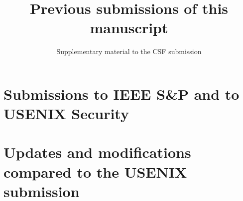 \documentclass[a4paper]{scrartcl}
\title{Previous submissions of this manuscript}
\subtitle{Supplementary material to the CSF submission}
\date{}
\begin{document}
  \maketitle

\section*{Submissions to IEEE S\&P and to USENIX Security}

\section*{Updates and modifications compared to the USENIX submission}
\end{document}
